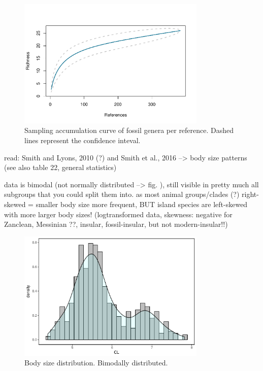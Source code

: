 \begin{figure}[htbp]
	\centering
	\includegraphics[width=0.8\textwidth]{MA_JJ_files/figure-latex/SACGenera-1.pdf}
	\caption[Sampling Accumulation Curve on generic level]{Sampling accumulation curve of fossil genera per reference. Dashed lines represent the confidence inteval.}
	\label{fig:SACGen}
\end{figure}


\FloatBarrier


read: Smith and Lyons, 2010 (?) and Smith et al., 2016
--> body size patterns (see also table 22, general statistics)

data is bimodal (not normally distributed --> fig. ), still visible in pretty much all subgroups that you could split them into.
as most animal groups/clades (?) right-skewed = smaller body size more frequent, BUT island species are left-skewed with more larger body sizes! (logtransformed data, skewness: negative for Zanclean, Messinian ??, insular, fossil-insular, but not modern-insular!!)






\begin{figure}[htbp]
	\centering
	\includegraphics[width=0.8\textwidth]{MA_JJ_files/figure-latex/HistAll-1.pdf}
	\caption[CL distribution]{Body size distribution. Bimodally distributed.}
	\label{fig:histAll}
\end{figure}




